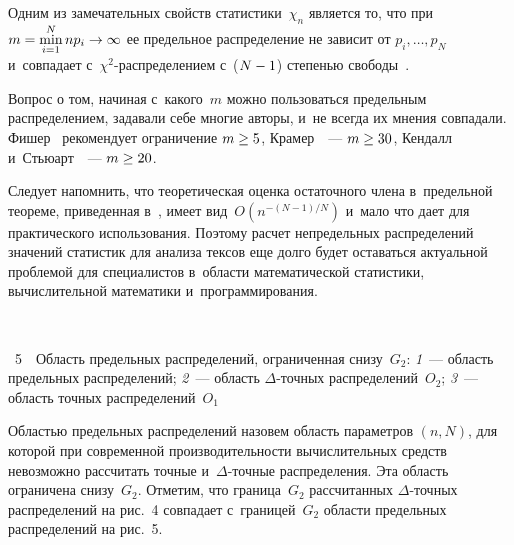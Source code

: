 \begin{multicols}{2}
    Одним из замечательных свойств статистики~$\chi_n$ является то, что 
при $m\hm =\min\limits_{i=1}^N np_i\hm\to\infty$ ее предельное распределение 
не зависит от $p_i, \ldots, p_N$ и~совпадает  
с~$\chi^2$-рас\-пре\-де\-ле\-ни\-ем с~($N\hm-1$) степенью  
свободы~\cite{4-mel}. 
    
    Вопрос о том, начиная с~какого~$m$ можно пользоваться предельным 
распределением, задавали себе многие авторы, и~не всегда их мнения 
совпадали. Фишер~\cite{5-mel} рекомендует ограничение $m\hm\geq5$, 
Крамер~\cite{4-mel}~--- $m\hm\geq30$, Кендалл и~Стьюарт~\cite{6-mel}~--- 
$m\hm\geq20$.
    
    Следует напомнить, что теоретическая оценка остаточного члена 
в~предельной теореме, приведенная в~\cite{7-mel}, имеет вид~$O(n^{-(N-1)/N})$ и~мало что дает для практического использования. Поэтому расчет 
непредельных распределений значений статистик для анализа тексов еще 
долго будет оставаться актуальной проблемой для специалистов в~области 
математической статистики, вычислительной математики 
и~программирования.

{ \begin{center}  %
 \mbox{%
\epsfxsize=79.137mm
}
\end{center}

\vspace*{-9pt}

\noindent
{{\figurename~5}\ \ \small{Область предельных распределений, ограниченная снизу~$G_2$:
     \textit{1}~--- область предельных распределений;
     \textit{2}~--- область $\Delta$-точных распределений~$O_2$;
     \textit{3}~--- область точных распределений~$O_1$}}
}



\vspace*{10pt}



\addtocounter{figure}{1}

        
    Областью предельных распределений назовем область параметров 
$(n, N)$, для которой при современной производительности 
вычислительных средств невозможно рассчитать точные  
и~$\Delta$-точ\-ные распределения. Эта область ограничена снизу~$G_2$. 
Отметим, что граница~$G_2$ рассчитанных $\Delta$-точ\-ных 
распределений на рис.~4 совпадает с~границей~$G_2$ области предельных 
распределений на рис.~5.

\vspace*{-9pt}
    


\end{multicols}
